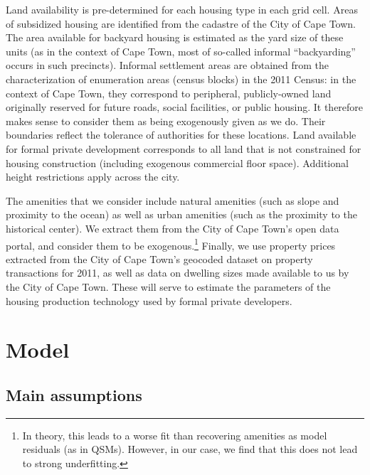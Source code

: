 \documentclass[12pt]{article}
\begin{document}
Land availability is pre-determined for each housing type in each grid cell. Areas of subsidized housing are identified from the cadastre of the City of Cape Town. The area available for backyard housing is estimated as the yard size of these units (as in the context of Cape Town, most of so-called informal ``backyarding'' occurs in such precincts). Informal settlement areas are obtained from the characterization of enumeration areas (census blocks) in the 2011 Census: in the context of Cape Town, they correspond to peripheral, publicly-owned land originally reserved for future roads, social facilities, or public housing. It therefore makes sense to consider them as being exogenously given as we do. Their boundaries reflect the tolerance of authorities for these locations. Land available for formal private development corresponds to all land that is not constrained for housing construction (including exogenous commercial floor space). Additional height restrictions apply across the city.

The amenities that we consider include natural amenities (such as slope and proximity to the ocean) as well as urban amenities (such as the proximity to the historical center). We extract them from the City of Cape Town's open data portal, and consider them to be exogenous.\footnote{In theory, this leads to a worse fit than recovering amenities as model residuals (as in QSMs). However, in our case, we find that this does not lead to strong underfitting.} Finally, we use property prices extracted from the City of Cape Town’s geocoded dataset on property transactions for 2011, as well as data on dwelling sizes made available to us by the City of Cape Town. These will serve to estimate the parameters of the housing production technology used by formal private developers.


\section{Model \label{sec:model}}

\subsection{Main assumptions}
\end{document}
